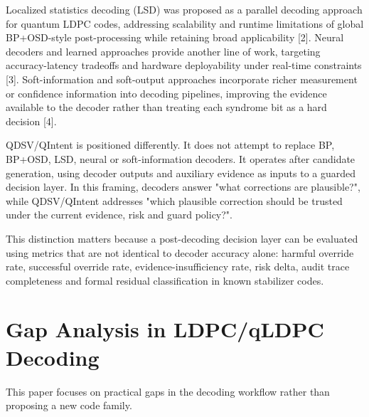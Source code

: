 \documentclass[11pt]{article}
\begin{document}
Localized statistics decoding (LSD) was proposed as a parallel decoding approach for quantum LDPC codes, addressing scalability and runtime limitations of global BP+OSD-style post-processing while retaining broad applicability [2]. Neural decoders and learned approaches provide another line of work, targeting accuracy-latency tradeoffs and hardware deployability under real-time constraints [3]. Soft-information and soft-output approaches incorporate richer measurement or confidence information into decoding pipelines, improving the evidence available to the decoder rather than treating each syndrome bit as a hard decision [4].


QDSV/QIntent is positioned differently. It does not attempt to replace BP, BP+OSD, LSD, neural or soft-information decoders. It operates after candidate generation, using decoder outputs and auxiliary evidence as inputs to a guarded decision layer. In this framing, decoders answer "what corrections are plausible?", while QDSV/QIntent addresses "which plausible correction should be trusted under the current evidence, risk and guard policy?".


This distinction matters because a post-decoding decision layer can be evaluated using metrics that are not identical to decoder accuracy alone: harmful override rate, successful override rate, evidence-insufficiency rate, risk delta, audit trace completeness and formal residual classification in known stabilizer codes.


\section{Gap Analysis in LDPC/qLDPC Decoding}

This paper focuses on practical gaps in the decoding workflow rather than proposing a new code family.
\end{document}
